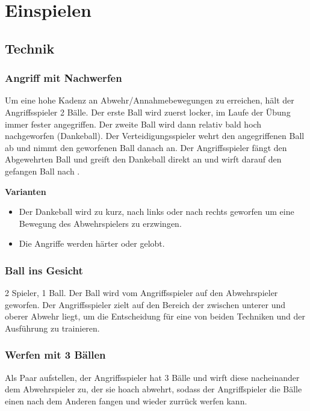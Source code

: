 \documentclass[]{book}
\providecommand{\tightlist}{%
  \setlength{\itemsep}{0pt}\setlength{\parskip}{0pt}}
\begin{document}
\chapter{Einspielen}\label{einspielen}

\section{Technik}\label{technik}

\subsection{Angriff mit Nachwerfen}\label{angriff-mit-nachwerfen}

Um eine hohe Kadenz an Abwehr/Annahmebewegungen zu erreichen, hält der
Angriffsspieler 2 Bälle. Der erste Ball wird zuerst locker, im Laufe der
Übung immer fester angegriffen. Der zweite Ball wird dann relativ bald
hoch nachgeworfen (Dankeball). Der Verteidigungsspieler wehrt den
angegriffenen Ball ab und nimmt den geworfenen Ball danach an. Der
Angriffsspieler fängt den Abgewehrten Ball und greift den Dankeball
direkt an und wirft darauf den gefangen Ball nach \citep{hauser2016}.

\textbf{Varianten}

\begin{itemize}
\tightlist
\item
  Der Dankeball wird zu kurz, nach links oder nach rechts geworfen um
  eine Bewegung des Abwehrspielers zu erzwingen.
\item
  Die Angriffe werden härter oder gelobt.
\end{itemize}

\subsection{Ball ins Gesicht}\label{ball-ins-gesicht}

2 Spieler, 1 Ball. Der Ball wird vom Angriffsspieler auf den
Abwehrspieler geworfen. Der Angriffsspieler zielt auf den Bereich der
zwischen unterer und oberer Abwehr liegt, um die Entscheidung für eine
von beiden Techniken und der Ausführung zu trainieren.

\subsection{Werfen mit 3 Bällen}\label{werfen-mit-3-ballen}

Als Paar aufstellen, der Angriffsspieler hat 3 Bälle und wirft diese
nacheinander dem Abwehrspieler zu, der sie hoach abwehrt, sodass der
Angriffspieler die Bälle einen nach dem Anderen fangen und wieder
zurrück werfen kann.
\end{document}
